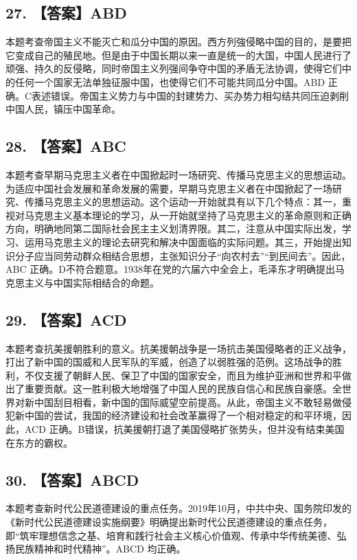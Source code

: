 \documentclass[UTF8,11pt]{ctexart}
\begin{document}
\subsection*{27. 【答案】ABD}

本题考查帝国主义不能灭亡和瓜分中国的原因。西方列強侵略中国的目的，是要把它变成自己的殖民地。但是由于中国长期以来一直是统一的大国，中国人民进行了顽强、持久的反侵略，同时帝国主义列强间争夺中国的矛盾无法协调，使得它们中的任何一个国家无法单独征服中国，也使得它们不可能共同瓜分中国。ABD 正确。C表述错误。帝国主义势力与中国的封建势力、买办势力相勾结共同压迫剥削中国人民，镇压中国革命。


\subsection*{28. 【答案】ABC}

本题考查早期马克思主义者在中国掀起时一场研究、传播马克思主义的思想运动。为适应中国社会发展和革命发展的需要，早期马克思主义者在中国掀起了一场研究、传播马克思主义的思想运动。这个运动一开始就具有以下几个特点：其一，重视对马克思主义基本理论的学习，从一开始就坚持了马克思主义的革命原则和正确方向，明确地同第二国际社会民主主义划清界限。其二，注意从中国实际出发，学习、运用马克思主义的理论去研究和解决中国面临的实际问题。其三，开始提出知识分子应当同劳动群众相结合思想，主张知识分子“向农村去”“到民间去”。因此，ABC 正确。D不符合题意。1938年在党的六届六中全会上，毛泽东才明确提出马克思主义与中国实际相结合的命题。


\subsection*{29. 【答案】ACD}

本题考查抗美援朝胜利的意义。抗美援朝战争是一场抗击美国侵略者的正义战争，打出了新中国的国威和人民军队的军威，创造了以弱胜强的范例。这场战争的胜利，不仅支援了朝鲜人民、保卫了中国的国家安全，而且为维护亚洲和世界和平做出了重要贡献。这一胜利极大地增强了中国人民的民族自信心和民族自豪感。全世界对新中国刮目相看，新中国的国际威望空前提高。从此，帝国主义不敢轻易做侵犯新中国的尝试，我国的经济建设和社会改革赢得了一个相对稳定的和平环境，因此，ACD 正确。B错误，抗美援朝打退了美国侵略扩张势头，但并没有结束美国在东方的霸权。


\subsection*{30. 【答案】ABCD}

本题考查新时代公民道德建设的重点任务。2019年10月，中共中央、国务院印发的《新时代公民道德建设实施纲要》明确提出新时代公民道德建设的重点任务，即“筑牢理想信念之基、培育和践行社会主义核心价值观、传承中华传统美德、弘扬民族精神和时代精神”。ABCD 均正确。
\end{document}
